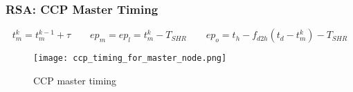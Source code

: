 \documentclass[10pt]{beamer}
\begin{document}
\begin{frame}
    \frametitle{RSA: CCP Master Timing}
    \begin{equation*}
        t^k_m = t^{k-1}_m + \tau \qquad 
        ep_m = ep_l = t^k_m - T_{SHR} \qquad 
        ep_o = t_h - f_{d2h}(t_d - t^k_m) - T_{SHR}
    \end{equation*}
    \begin{figure}[H]
        \texttt{[image: ccp\_timing\_for\_master\_node.png]}
        \caption{CCP master timing}
        \label{fig:interupt_latency_master}
    \end{figure}
\end{frame}
\end{document}
